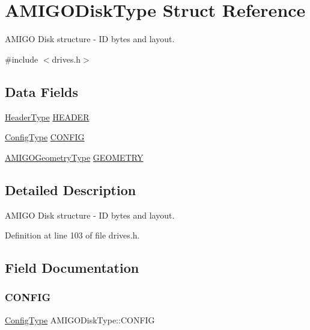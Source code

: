 \hypertarget{structAMIGODiskType}{}\section{A\+M\+I\+G\+O\+Disk\+Type Struct Reference}
\label{structAMIGODiskType}


A\+M\+I\+GO Disk structure -\/ ID bytes and layout.  




{\ttfamily \#include $<$drives.\+h$>$}

\subsection*{Data Fields}
\begin{DoxyCompactItemize}
\item 
\hyperlink{structHeaderType}{Header\+Type} \hyperlink{structAMIGODiskType_a9814efe6f564b104fc7e0100231908a8}{H\+E\+A\+D\+ER}
\item 
\hyperlink{structConfigType}{Config\+Type} \hyperlink{structAMIGODiskType_aae94c3403ceb917006591e7bd4109207}{C\+O\+N\+F\+IG}
\item 
\hyperlink{structAMIGOGeometryType}{A\+M\+I\+G\+O\+Geometry\+Type} \hyperlink{structAMIGODiskType_ade07402a60cc0e5824ca61f6a4ea88d9}{G\+E\+O\+M\+E\+T\+RY}
\end{DoxyCompactItemize}


\subsection{Detailed Description}
A\+M\+I\+GO Disk structure -\/ ID bytes and layout. 

Definition at line 103 of file drives.\+h.



\subsection{Field Documentation}
\mbox{\label{structAMIGODiskType_aae94c3403ceb917006591e7bd4109207}} 
\subsubsection{\texorpdfstring{C\+O\+N\+F\+IG}{CONFIG}}
{\footnotesize\ttfamily \hyperlink{structConfigType}{Config\+Type} A\+M\+I\+G\+O\+Disk\+Type\+::\+C\+O\+N\+F\+IG}



